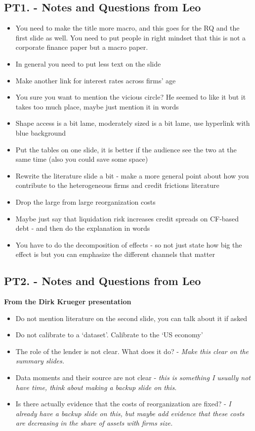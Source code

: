 \documentclass[12pt]{article}
\begin{document}
\subsection*{PT1. - Notes and Questions from Leo \checkmark} 
\begin{itemize} \setlength\itemsep{0em}  \small
    \item You need to make the title more macro, and this goes for the RQ and the first slide as well. You need to put people in right mindset that this is not a corporate finance paper but a macro paper.
    \item In general you need to put less text on the slide
    \item Make another link for interest rates across firms' age 
    \item You sure you want to mention the vicious circle? He seemed to like it but it takes too much place, maybe just mention it in words
    \item Shape access is a bit lame, moderately sized is a bit lame, use hyperlink with blue background
    \item Put the tables on one slide, it is better if the audience see the two at the same time (also you could save some space)
    \item Rewrite the literature slide a bit - make a more general point about how you contribute to the heterogeneous firms and credit frictions literature
    \item Drop the large from large reorganization costs
    \item Maybe just say that liquidation risk increases credit spreads on CF-based debt - and then do the explanation in words
    \item You have to do the decomposition of effects - so not just state how big the effect is but you can emphasize the different channels that matter  
 \end{itemize}    

\subsection*{PT2. - Notes and Questions from Leo \checkmark} 
\textbf{From the Dirk Krueger presentation}
\begin{itemize} \setlength\itemsep{0em}
    \item Do not mention literature on the second slide, you can talk about it if asked
    \item Do not calibrate to a `dataset'. Calibrate to the `US economy'
    \item The role of the lender is not clear. What does it do? - \textit{Make this clear on the summary slides.}
    \item Data moments and their source are not clear - \textit{this is something I usually not have time, think about making a backup slide on this.}
    \item Is there actually evidence that the costs of reorganization are fixed? - \textit{I already have a backup slide on this, but maybe add evidence that these costs are decreasing in the share of assets with firms size.}
\end{itemize} \normalsize
\end{document}
